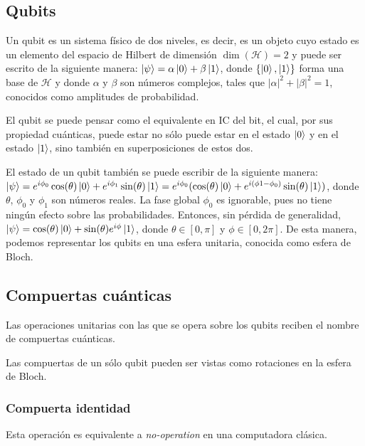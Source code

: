 \documentclass[11pt, spanish]{report}
\begin{document}
\subsection{Qubits}
Un qubit es un sistema físico de dos niveles, es decir, es un objeto cuyo estado es un elemento del espacio de Hilbert de dimensión $\dim (\mathcal{H})=2$ y puede ser escrito de la siguiente manera: $ \ket{\psi} = \alpha \ket{0} + \beta \ket{1} $, donde $ \{ \ket{0},\ket{1} \} $ forma una base de $\mathcal{H}$ y donde $ \alpha $ y $ \beta $ son números complejos, tales que $ | \alpha |^2 + | \beta |^2 = 1 $, conocidos como amplitudes de probabilidad.
\vspace{0.5cm}

El qubit se puede pensar como el equivalente en IC del bit, el cual, por sus propiedad cuánticas, puede estar no sólo puede estar en el estado $\ket{0}$ y en el estado $\ket{1}$, sino también en superposiciones de estos dos.
\vspace{0.5cm}

El estado de un qubit también se puede escribir de la siguiente manera: $ \ket{\psi} = e^{i \phi_0} \cos ( \theta ) \ket{0} + e^{i \phi_1} \sin ( \theta ) \ket{1}  = e^{i \phi_0} (\cos ( \theta ) \ket{0} + e^{i ( \phi1 - \phi_0 )} \sin ( \theta ) \ket{1}) $, donde $ \theta $, $\phi_0$ y $\phi_1$ son números reales. La fase global $\phi_0$ es ignorable, pues no tiene ningún efecto sobre las probabilidades. Entonces, sin pérdida de generalidad, $ \ket{\psi} = \cos ( \theta ) \ket{0} + \sin ( \theta ) e^{i \phi} \ket{1} $, donde $ \theta \in [0, \pi ] $ y $ \phi \in [0, 2 \pi ] $. De esta manera, podemos representar los qubits en una esfera unitaria, conocida como esfera de Bloch.

\subsection{Compuertas cuánticas}
Las operaciones unitarias con las que se opera sobre los qubits reciben el nombre de compuertas cuánticas.
\vspace{0.5cm}

Las compuertas de un sólo qubit pueden ser vistas como rotaciones en la esfera de Bloch.

\subsubsection{Compuerta identidad}

Esta operación es equivalente a \textit{no-operation} en una computadora clásica.
\end{document}
